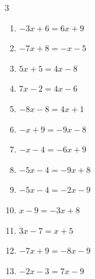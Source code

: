 \begin{multicols}{3}
\begin{enumerate}

  \item $-3x+6=6x+9$


  \item $-7x+8=-x-5$


  \item $5x+5=4x-8$

        \phantom{$\displaystyle x=-13$}

  \item $7x-2=4x-6$


  \item $-8x-8=4x+1$


  \item $-x+9=-9x-8$


  \item $-x-4=-6x+9$


\columnbreak %

  \item $-5x-4=-9x+8$

        \phantom{$\displaystyle x=3$}

  \item $-5x-4=-2x-9$


  \item $x-9=-3x+8$


  \item $3x-7=x+5$

        \phantom{$\displaystyle x=6$}

  \item $-7x+9=-8x-9$

        \phantom{$\displaystyle x=-18$}

  \item $-2x-3=7x-9$



\end{enumerate}
\end{multicols}
